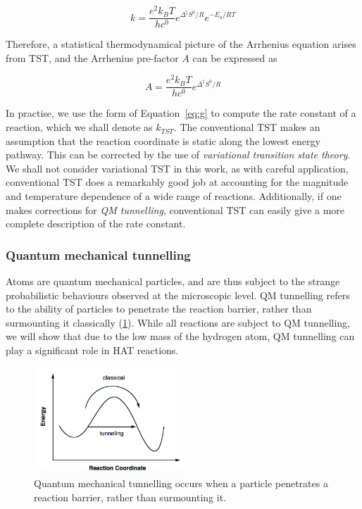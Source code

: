 \begin{equation}
  k = \frac{e^2k_B T}{hc^0}e^{\Delta^\ddagger S^0/R}e^{-E_a/RT}
\end{equation}

Therefore, a statistical thermodynamical picture of the Arrhenius equation
arises from TST, and the Arrhenius pre-factor $A$ can be expressed as

\begin{equation}
  A = \frac{e^2k_B T}{hc^0}e^{\Delta^\ddagger S^0/R}
\label{eq:afactor}
\end{equation}

In practise, we use the form of Equation~\ref{eq:g} to compute the rate
constant of a reaction, which we shall denote as $k_{TST}$. The conventional
TST makes an assumption that the reaction coordinate is static along the lowest
energy pathway. This can be corrected by the use of \emph{variational
transition state theory}.\cite{Truhlar1984} We shall not consider variational
TST in this work, as with careful application, conventional TST does a
remarkably good job at accounting for the magnitude and temperature dependence
of a wide range of reactions.\cite{Steinfeld1998} Additionally, if one makes
corrections for \emph{QM tunnelling}, conventional TST can easily give a more
complete description of the rate constant.

\subsubsection{Quantum mechanical tunnelling}

Atoms are quantum mechanical particles, and are thus subject to the strange
probabilistic behaviours observed at the microscopic level. QM tunnelling
refers to the ability of particles to penetrate the reaction barrier, rather
than surmounting it classically (\ref{fig:tunnelling}). While all reactions are
subject to QM tunnelling, we will show that due to the low mass of the hydrogen
atom, QM tunnelling can play a significant role in HAT reactions.

\begin{figure}[htb]
  \centering
  \includegraphics[width=0.5\textwidth]{figures/tunnelling-1}
  \caption{Quantum mechanical tunnelling occurs when a particle penetrates a
    reaction barrier, rather than surmounting it.}
\label{fig:tunnelling}
\end{figure}


